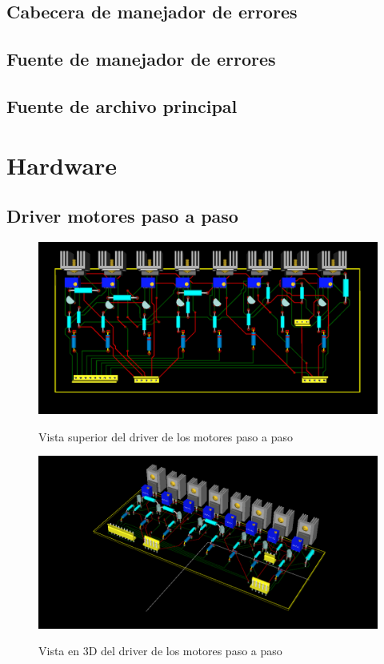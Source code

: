 \subsection{Cabecera de manejador de errores}


\subsection{Fuente de manejador de errores}\label{cap:errors}


\subsection{Fuente de archivo principal}


\newpage
\section{Hardware}
\subsection{Driver motores paso a paso}
\begin{figure}[htp]
  \centering
  \includegraphics[width=14cm]{./img/driver_3d_1.png}
  \label{fig:driver_3d_1}
  \caption{Vista superior del driver de los motores paso a paso}
\end{figure}

\begin{figure}[htp]
  \centering
  \includegraphics[width=14cm]{./img/driver_3d_2.png}
  \label{fig:driver_3d_2}
  \caption{Vista en 3D del driver de los motores paso a paso}
\end{figure}

